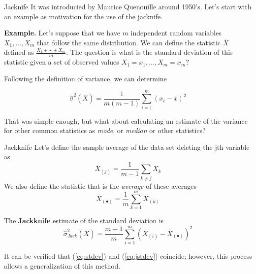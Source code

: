 \documentclass{beamer}
\begin{document}
\begin{frame}{Jacknife}
	It was introducied by Maurice Quenouille around 1950's.  Let's start with an example as motivation for the use of the jacknife. 
	
	{\bf Example. } Let's suppose that we have 
	$m$ independent random variables $X_1,\ldots, X_m$ that follow the same distribution. We can define the statistic $\overline{X}$ defined as $\frac{X_1 + \cdots + X_m}{m}$. The question is what is the standard deviation of this statistic given a set of observed values $X_1=x_1,\ldots, X_m=x_m$?
	
	Following the definition of variance, we can determine
	
	\begin{equation}
		\widehat{\sigma}^2(\overline{X})= \frac{1}{m(m-1)} \sum_{i=1}^m (x_i - \overline{x})^2
		\label{eq:stdev}
	\end{equation}
	
	That was simple enough, but what about calculating an estimate of the variance for other common statistics as  {\it mode}, or {\it median} or other statistics?
	
\end{frame}

\begin{frame}{Jackknife}
	Let's define the sample average of the data set deleting the jth variable as
	\begin{equation*}
		\overline{X}_{(j)}= \frac{1}{m-1} \sum_{k\ne j} X_k
	\end{equation*}
We also define the statistic that is the {\it average} of these averages
\begin{equation*}
	\overline{X}_{(\bullet)} = \frac{1}{m} \sum_{k=1}^m \overline{X}_{(k)}
\end{equation*}

The {\bf Jackknife} estimate of the standard deviation is
\begin{equation}
	\widehat{\sigma}_{Jack}^2(\overline{X})= \frac{m-1}{m} \sum_{i=1}^m (\overline{X}_{(i)} - \overline{X}_{(\bullet)})^2
\label{eq:jstdev}
\end{equation}

It can be verified that (\ref{eq:stdev}) and (\ref{eq:jstdev})  coincide; however, this process allows a generalization of this method.
\end{frame}
\end{document}
